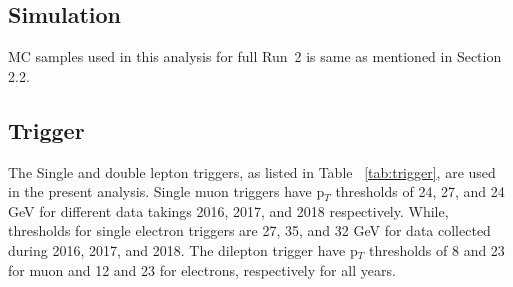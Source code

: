 \documentclass{cernatlasnote}
\newcommand{\fbinv}{\! fb$^{-1}$\xspace}
\begin{document}

\subsection{Simulation}\label{sec:samples}
 MC samples used in this analysis for full Run~2 is same as mentioned in Section 2.2. 


\subsection{Trigger}
The Single and double lepton triggers, as listed in Table ~\ref{tab:trigger}, are used in the present analysis. Single muon triggers have p$_{T}$ thresholds of 24, 27, and 24 GeV for different data takings 2016, 2017, and 2018 respectively. While, thresholds for single electron triggers are 27, 35, and 32 GeV for data collected during 2016, 2017, and 2018. 
The dilepton trigger have p$_{T}$ thresholds of 8 and 23 for muon and 12 and 23 for electrons, respectively for all years.
\end{document}
